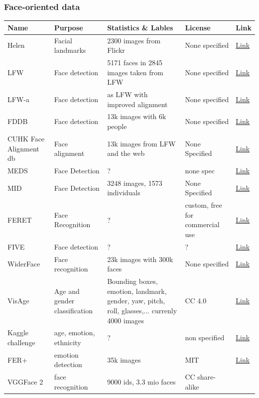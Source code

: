 \hypertarget{face-oriented-data}{%
\subsubsection{Face-oriented data}\label{face-oriented-data}}

\begin{longtable}[]{@{}p{}p{}p{}p{}p{}@{}}
\toprule
Name & Purpose & Statistics \& Lables & License & Link\tabularnewline
\midrule
\endhead
Helen & Facial landmarks & 2300 images from Flickr & None specified &
\href{http://www.ifp.illinois.edu/~vuongle2/helen/}{Link}\tabularnewline
LFW & Face detection & 5171 faces in 2845 images taken from LFW & None
specified & \href{http://vis-www.cs.umass.edu/lfw/}{Link}\tabularnewline
LFW-a & Face detection & as LFW with improved alignment & None specified
&
\href{https://talhassner.github.io/home/projects/lfwa/index.html}{Link}\tabularnewline
FDDB & Face detection & 13k images with 6k people & None specified &
\href{http://vis-www.cs.umass.edu/fddb/}{Link}\tabularnewline
CUHK Face Alignment db & Face alignment & 13k images from LFW and the
web & None Specified &
\href{http://mmlab.ie.cuhk.edu.hk/archive/CNN_FacePoint.htm}{Link}\tabularnewline
MEDS & Face Detection & ? & none spec &
\href{https://www.nist.gov/itl/iad/image-group/special-database-32-multiple-encounter-dataset-meds}{Link}\tabularnewline
MID & Face Detection & 3248 images, 1573 individuals & None Specified &
\href{https://www.nist.gov/srd/nist-special-database-18}{Link}\tabularnewline
FERET & Face Recognition & ? & custom, free for commercial use &
\href{https://www.nist.gov/itl/iad/image-group/color-feret-database}{Link}\tabularnewline
FIVE & Face detection & ? & ? &
\href{https://www.nist.gov/programs-projects/face-video-evaluation-five}{Link}\tabularnewline
WiderFace & Face recognition & 23k images with 300k faces & None
specified &
\href{http://mmlab.ie.cuhk.edu.hk/projects/WIDERFace/}{Link}\tabularnewline
VisAge & Age and gender classification & Bounding boxes, emotion,
landmark, gender, yaw, pitch, roll, glasses,... currenly 4000 images &
CC 4.0 &
\href{https://www.forensicsandsecurity.com/visage.php}{Link}\tabularnewline
Kaggle challenge & age, emotion, ethnicity & ? & non specified &
\href{https://www.kaggle.com/dataturks/face-dataset-with-age-emotion-ethnicity}{Link}\tabularnewline
FER+ & emotion detection & 35k images & MIT &
\href{https://github.com/Microsoft/FERPlus}{Link}\tabularnewline
VGGFace 2 & face recognition & 9000 ids, 3.3 mio faces & CC share-alike

\end{longtable}
